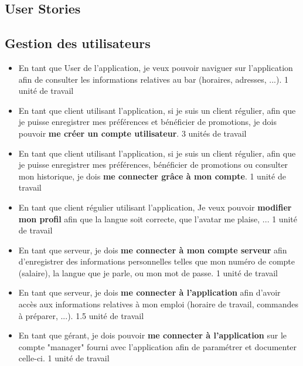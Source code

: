 \documentclass[11pt,a4paper]{article}
\begin{document}
\begin{spacing}{1.1}
\section{User Stories}
\subsection{Gestion des utilisateurs}

\begin{itemize}[label=\textbullet,font=\color{cyan}]
\item En tant que User de l'application, je veux pouvoir naviguer sur l'application afin de consulter les informations relatives au bar (horaires, adresses, ...).
{\color{cyan} 1 unité de travail}

\item En tant que client utilisant l'application, si je suis un client régulier, afin que je puisse enregistrer mes préférences et bénéficier de promotions, je dois pouvoir \textbf{me créer un compte utilisateur}.
{\color{cyan} 3 unités de travail}

\item En tant que client utilisant l'application, si je suis un client régulier, afin que je puisse enregistrer mes préférences, bénéficier de promotions ou consulter mon historique, je dois \textbf{me connecter grâce à mon compte}.
{\color{cyan} 1 unité de travail}

\item En tant que client régulier utilisant l'application, Je veux pouvoir \textbf{modifier mon profil} afin que la langue soit correcte, que l'avatar me plaise, ...
{\color{cyan} 1 unité de travail}

\item En tant que serveur, je dois \textbf{me connecter à mon compte serveur} afin d'enregistrer des informations personnelles telles que mon numéro de compte (salaire), la langue que je parle, ou mon mot de passe.
{\color{cyan} 1 unité de travail}

\item En tant que serveur, je dois \textbf{me connecter à l'application} afin d'avoir accès aux informations relatives à mon emploi (horaire de travail, commandes à préparer, ...).
{\color{cyan} 1.5 unité de travail}

\item En tant que gérant, je dois pouvoir \textbf{me connecter à l'application} sur le compte "manager" fourni avec l'application afin de paramétrer et documenter celle-ci.
{\color{cyan} 1 unité de travail}


\end{itemize}
\end{spacing}
\end{document}
